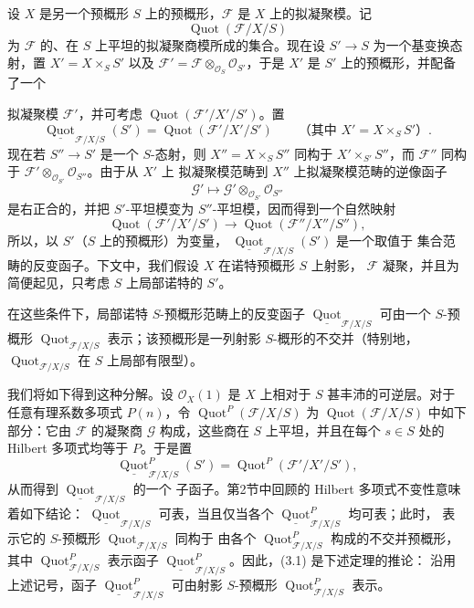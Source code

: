 
设 $X$ 是另一个预概形 $S$ 上的预概形，$\mathcal F$ 是 $X$ 上的拟凝聚模。记
\[
\operatorname{Quot}(\mathcal F/X/S)
\]
为 $\mathcal F$ 的、在 $S$ 上平坦的拟凝聚商模所成的集合。现在设
$S'\longrightarrow S$ 为一个基变换态射，置
$X'=X\times_S S'$ 以及
$\mathcal F'=\mathcal F\otimes_{\mathcal O_S}\mathcal O_{S'}$，于是
$X'$ 是 $S'$ 上的预概形，并配备了一个

拟凝聚模 $\mathcal F'$，并可考虑
$\operatorname{Quot}(\mathcal F'/X'/S')$。置
\[
\underline{\operatorname{Quot}}_{\mathcal F/X/S}(S')
=\operatorname{Quot}(\mathcal F'/X'/S')
\qquad\text{（其中 $X'=X\times_SS'$）}.
\]
现在若 $S''\longrightarrow S'$ 是一个 $S$-态射，则
$X''=X\times_SS''$ 同构于 $X'\times_{S'}S''$，而 $\mathcal F''$ 同构于
$\mathcal F'\otimes_{\mathcal O_{S'}}\mathcal O_{S''}$。由于从 $X'$ 上
拟凝聚模范畴到 $X''$ 上拟凝聚模范畴的逆像函子
\[
\mathcal G'\longmapsto
\mathcal G'\otimes_{\mathcal O_{S'}}\mathcal O_{S''}
\]
是右正合的，并把 $S'$-平坦模变为 $S''$-平坦模，因而得到一个自然映射
\[
\operatorname{Quot}(\mathcal F'/X'/S')\longrightarrow
\operatorname{Quot}(\mathcal F''/X''/S''),
\]
所以，以 $S'$（$S$ 上的预概形）为变量，
$\underline{\operatorname{Quot}}_{\mathcal F/X/S}(S')$ 是一个取值于
集合范畴的反变函子。下文中，我们假设 $X$ 在诺特预概形 $S$ 上射影，
$\mathcal F$ 凝聚，并且为简便起见，只考虑 $S$ 上局部诺特的 $S'$。

 在这些条件下，局部诺特 $S$-预概形范畴上的反变函子
$\underline{\operatorname{Quot}}_{\mathcal F/X/S}$ 可由一个 $S$-预概形
$\operatorname{Quot}_{\mathcal F/X/S}$ 表示；该预概形是一列射影
$S$-概形的不交并（特别地，
$\operatorname{Quot}_{\mathcal F/X/S}$ 在 $S$ 上局部有限型）。

我们将如下得到这种分解。设 $\mathcal O_X(1)$ 是 $X$ 上相对于 $S$
甚丰沛的可逆层。对于任意有理系数多项式 $P(n)$，令
$\operatorname{Quot}^P(\mathcal F/X/S)$ 为
$\operatorname{Quot}(\mathcal F/X/S)$ 中如下部分：它由 $\mathcal F$
的凝聚商 $\mathcal G$ 构成，这些商在 $S$ 上平坦，并且在每个
$s\in S$ 处的 Hilbert 多项式均等于 $P$。于是置
\[
\underline{\operatorname{Quot}}^P_{\mathcal F/X/S}(S')
=\operatorname{Quot}^P(\mathcal F'/X'/S'),
\]
从而得到 $\underline{\operatorname{Quot}}_{\mathcal F/X/S}$ 的一个
子函子。第2节中回顾的 Hilbert 多项式不变性意味着如下结论：
$\underline{\operatorname{Quot}}_{\mathcal F/X/S}$ 可表，当且仅当各个
$\underline{\operatorname{Quot}}^P_{\mathcal F/X/S}$ 均可表；此时，
表示它的 $S$-预概形 $\operatorname{Quot}_{\mathcal F/X/S}$ 同构于
由各个 $\operatorname{Quot}^P_{\mathcal F/X/S}$ 构成的不交并预概形，
其中 $\operatorname{Quot}^P_{\mathcal F/X/S}$ 表示函子
$\underline{\operatorname{Quot}}^P_{\mathcal F/X/S}$。因此，(3.1)
是下述定理的推论：
 沿用上述记号，函子
$\underline{\operatorname{Quot}}^P_{\mathcal F/X/S}$ 可由射影
$S$-预概形 $\operatorname{Quot}^P_{\mathcal F/X/S}$ 表示。

